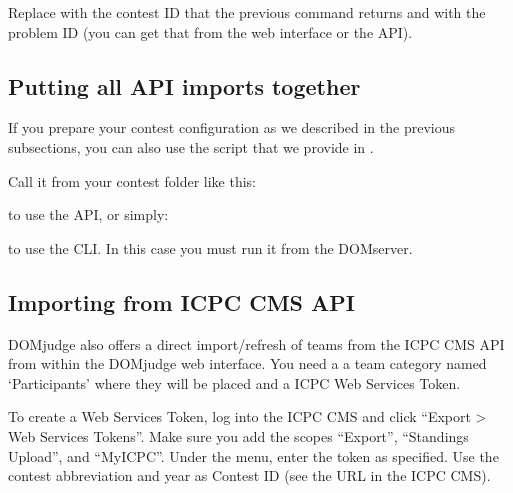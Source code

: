\documentclass[a4paper,10pt,english,openany]{sphinxmanual}
\begin{document}
\sphinxAtStartPar
Replace  with the contest ID that the previous command returns and
 with the problem ID (you can get that from the web interface or
the API).


\subsection{Putting all API imports together}
\label{\detokenize{import:putting-all-api-imports-together}}
\sphinxAtStartPar
If you prepare your contest configuration as we described in the previous
subsections, you can also use the script that we provide in
.

\sphinxAtStartPar
Call it from your contest folder like this:

\begin{sphinxVerbatim}[commandchars=\\\{\}]
 
\end{sphinxVerbatim}

\sphinxAtStartPar
to use the API, or simply:

\begin{sphinxVerbatim}[commandchars=\\\{\}]
\end{sphinxVerbatim}

\sphinxAtStartPar
to use the CLI. In this case you must run it from the DOMserver.


\subsection{Importing from ICPC CMS API}
\label{\detokenize{import:importing-from-icpc-cms-api}}
\sphinxAtStartPar
DOMjudge also offers a direct import/refresh of teams from the ICPC CMS API from
within the DOMjudge web interface. You need a  a team category named ‘Participants’
where they will be placed and a ICPC Web Services Token.

\sphinxAtStartPar
To create a Web Services Token, log into the ICPC CMS and click “Export \textgreater{} Web
Services Tokens”. Make sure you add the scopes “Export”, “Standings Upload”,
and “MyICPC”.  Under the  menu, enter the token as specified.
Use the contest abbreviation and year as Contest ID (see the URL in the ICPC
CMS).
\end{document}
